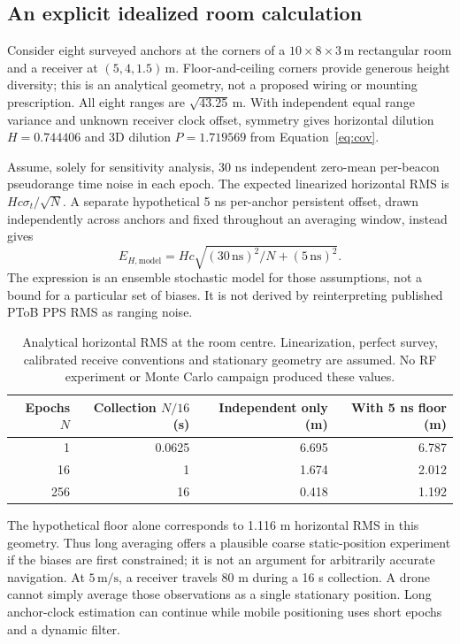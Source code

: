 \documentclass[11pt,letterpaper]{article}
\newcommand{\ns}{\,\mathrm{ns}}\newcommand{\us}{\,\mu\mathrm{s}}\newcommand{\ms}{\,\mathrm{ms}}
\begin{document}
\subsection{An explicit idealized room calculation}\label{sec:roomcalc}
Consider eight surveyed anchors at the corners of a $10\times8\times3\,\mathrm{m}$ rectangular room and a receiver at $(5,4,1.5)\,\mathrm{m}$. Floor-and-ceiling corners provide generous height diversity; this is an analytical geometry, not a proposed wiring or mounting prescription. All eight ranges are $\sqrt{43.25}\,\mathrm{m}$. With independent equal range variance and unknown receiver clock offset, symmetry gives horizontal dilution $H=0.744406$ and 3D dilution $P=1.719569$ from Equation~\ref{eq:cov}.

Assume, solely for sensitivity analysis, 30 ns independent zero-mean per-beacon pseudorange time noise in each epoch. The expected linearized horizontal RMS is $Hc\sigma_t/\sqrt N$. A separate hypothetical 5 ns per-anchor persistent offset, drawn independently across anchors and fixed throughout an averaging window, instead gives
\begin{equation}
 E_{H,\mathrm{model}}=Hc\sqrt{(30\ns)^2/N+(5\ns)^2}.\label{eq:floor}
\end{equation}
The expression is an ensemble stochastic model for those assumptions, not a bound for a particular set of biases. It is not derived by reinterpreting published PToB PPS RMS as ranging noise.

\begin{table}[ht]\centering\small
\caption{Analytical horizontal RMS at the room centre. Linearization, perfect survey, calibrated receive conventions and stationary geometry are assumed. No RF experiment or Monte Carlo campaign produced these values.}\label{tab:average}
\begin{tabular}{@{}rrrr@{}}\toprule
Epochs $N$ & Collection $N/16$ (s) & Independent only (m) & With 5 ns floor (m)\\\midrule
1&0.0625&6.695&6.787\\
16&1&1.674&2.012\\
256&16&0.418&1.192\\\bottomrule\end{tabular}
\end{table}

The hypothetical floor alone corresponds to 1.116 m horizontal RMS in this geometry. Thus long averaging offers a plausible coarse static-position experiment if the biases are first constrained; it is not an argument for arbitrarily accurate navigation. At $5\,\mathrm{m/s}$, a receiver travels 80 m during a 16 s collection. A drone cannot simply average those observations as a single stationary position. Long anchor-clock estimation can continue while mobile positioning uses short epochs and a dynamic filter.
\end{document}
